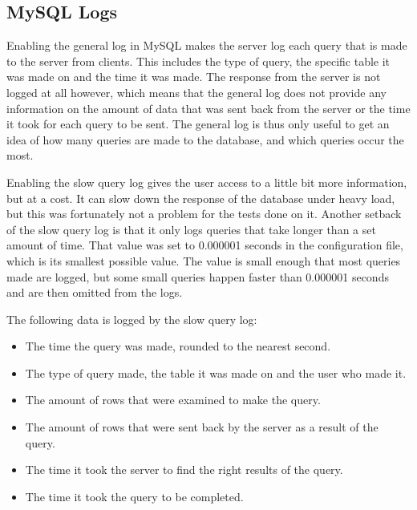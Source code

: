 \subsection{MySQL Logs}
%

Enabling the general log in MySQL makes the server log each query that is made to the server from clients. This includes the type of query, the specific table it was made on and the time it was made. The response from the server is not logged at all however, which means that the general log does not provide any information on the amount of data that was sent back from the server or the time it took for each query to be sent. The general log is thus only useful to get an idea of how many queries are made to the database, and which queries occur the most.

Enabling the slow query log gives the user access to a little bit more information, but at a cost. It can slow down the response of the database under heavy load, but this was fortunately not a problem for the tests done on it. Another setback of the slow query log is that it only logs queries that take longer than a set amount of time. That value was set to 0.000001 seconds in the configuration file, which is its smallest possible value. The value is small enough that most queries made are logged, but some small queries happen faster than 0.000001 seconds and are then omitted from the logs. 

The following data is logged by the slow query log:

\begin{itemize}
	\item The time the query was made, rounded to the nearest second.
	\item The type of query made, the table it was made on and the user who made it.
	\item The amount of rows that were examined to make the query.
	\item The amount of rows that were sent back by the server as a result of the query.
	\item The time it took the server to find the right results of the query.
	\item The time it took the query to be completed.
\end{itemize}

